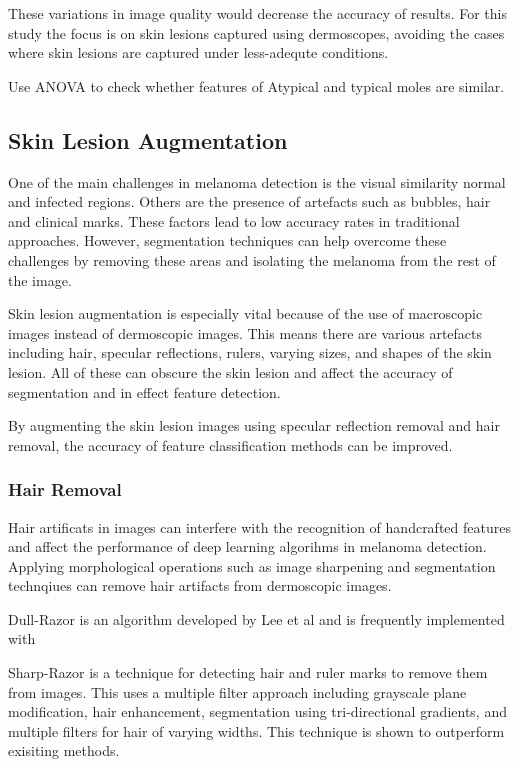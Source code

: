 These variations in image quality would decrease the accuracy of results. For this study the focus is on skin lesions captured using dermoscopes, avoiding the cases where skin lesions are captured under less-adequte conditions.

Use ANOVA to check whether features of Atypical and typical moles are similar.





\subsection{Skin Lesion Augmentation}
One of the main challenges in melanoma detection is the visual similarity normal and infected regions. Others are the presence of artefacts such as bubbles, hair and clinical marks\cite{Albahli2020}. These factors lead to low accuracy rates in traditional approaches. However, segmentation techniques can help overcome these challenges by removing these areas and isolating the melanoma from the rest of the image.

Skin lesion augmentation is especially vital because of the use of macroscopic images instead of dermoscopic images. This means there are various artefacts including hair, specular reflections, rulers, varying sizes, and shapes of the skin lesion. All of these can obscure the skin lesion and affect the accuracy of segmentation\cite{Unver2019} and in effect feature detection.

By augmenting the skin lesion images using specular reflection removal and hair removal, the accuracy of feature classification methods can be improved\cite{kasmi2023}. 

\subsubsection{Hair Removal}
Hair artificats in images can interfere with the recognition of handcrafted features and affect the performance of deep learning algorihms in melanoma detection\cite{kasmi2023}. Applying morphological operations such as image sharpening and segmentation technqiues can remove hair artifacts from dermoscopic images\cite{kasmi2023}.

Dull-Razor is an algorithm developed by Lee et al\cite{Lee1997} and is frequently implemented with 

Sharp-Razor\cite{kasmi2023} is a technique for detecting hair and ruler marks to remove them from  images. This uses a multiple filter approach including grayscale plane modification, hair enhancement, segmentation using tri-directional gradients, and multiple filters for hair of varying widths. This technique is shown to outperform exisiting methods.

